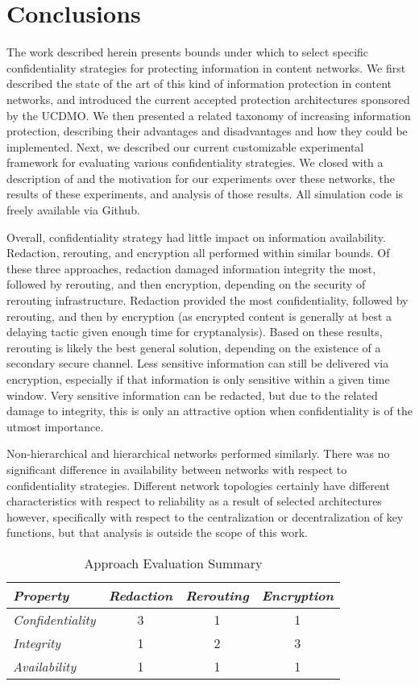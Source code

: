 \section{Conclusions}
The work described herein presents bounds under which to select specific confidentiality strategies for protecting information in content networks.  We first described the state of the art of this kind of information protection in content networks, and introduced the current accepted protection architectures sponsored by the UCDMO.  We then presented a related taxonomy of increasing information protection, describing their advantages and disadvantages and how they could be implemented.  Next, we described our current customizable experimental framework for evaluating various confidentiality strategies.  We closed with a description of and the motivation for our experiments over these networks, the results of these experiments, and analysis of those results.  All simulation code is freely available via Github.

Overall, confidentiality strategy had little impact on information availability.  Redaction, rerouting, and encryption all performed within similar bounds.  Of these three approaches, redaction damaged information integrity the most, followed by rerouting, and then encryption, depending on the security of rerouting infrastructure.  Redaction provided the most confidentiality, followed by rerouting, and then by encryption (as encrypted content is generally at best a delaying tactic given enough time for cryptanalysis).  Based on these results, rerouting is likely the best general solution, depending on the existence of a secondary secure channel.  Less sensitive information can still be delivered via encryption, especially if that information is only sensitive within a given time window.  Very sensitive information can be redacted, but due to the related damage to integrity, this is only an attractive option when confidentiality is of the utmost importance.
	
Non-hierarchical and hierarchical networks performed similarly.  There was no significant difference in availability between networks with respect to confidentiality strategies.  Different network topologies certainly have different characteristics with respect to reliability as a result of selected architectures however, specifically with respect to the centralization or decentralization of key functions, but that analysis is outside the scope of this work.
	
\begin{table*}[tp] %
\centering %
\begin{tabular}{lccc}
\toprule %
{\it Property}			& {\it Redaction}	& {\it Rerouting} 	& {\it Encryption} 	\\\toprule
{\it Confidentiality} 	& 3				  	& 1					& 1				 	\\\midrule
{\it Integrity}			& 1					& 2					& 3 					\\\midrule
{\it Availability}		& 1					& 1					& 1					\\\bottomrule
\end{tabular}
\caption{Approach Evaluation Summary}
\label{table:model:evaluation}
\end{table*}

